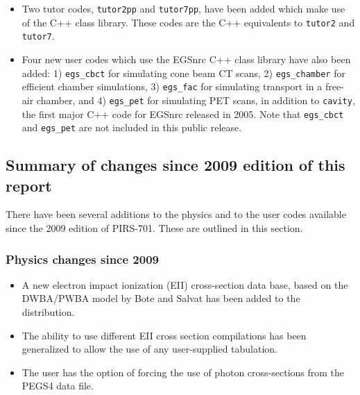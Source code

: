 \begin{itemize}

\item Two tutor codes, {\tt tutor2pp} and {\tt tutor7pp}, have been
added which make use of the C++ class library.  These codes are the
C++ equivalents to {\tt tutor2} and {\tt tutor7}.

\item Four new user codes which use the EGSnrc C++ class library have
also been added: 1) {\tt egs\_cbct} for simulating cone beam CT scans,
2) {\tt egs\_chamber} for efficient chamber simulations, 3) {\tt egs\_fac}
for simulating transport in a free-air chamber, and 4) {\tt egs\_pet} for
simulating PET scans, in addition to {\tt cavity}, the first major C++ code 
for EGSnrc released in 2005. Note that {\tt egs\_cbct} and {\tt egs\_pet} 
are not included in this public release.

\end{itemize} 

\subsection{Summary of changes since 2009 edition of this report}

There have been several additions to the physics 
and to the user codes available since the 
2009 edition of PIRS-701.  These are outlined in this section.

\subsubsection{Physics changes since 2009} 

\begin{itemize}

  \item A new electron impact ionization (EII) cross-section data base, 
        based on the DWBA/PWBA model by Bote and Salvat has been added
        to the distribution.

  \item The ability to use different EII cross section compilations
        has been generalized to allow the use of any user-supplied 
        tabulation.

  \item The user has the option of forcing the use of photon 
        cross-sections from the PEGS4 data file.

\end{itemize}

